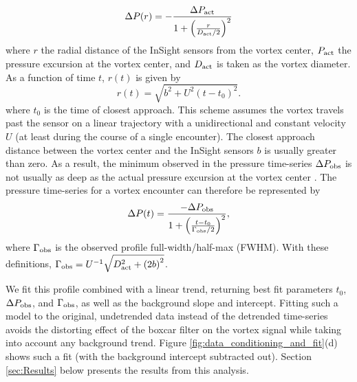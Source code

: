 \documentclass{aastex63}
\begin{document}
\begin{equation}
    \Delta P(r) = -\frac{\Delta P_{\rm act}}{1 + \left( \frac{r}{D_{\rm act}/2} \right)^2}\label{eqn:radial_lorentzian_profile}
\end{equation}
where $r$ the radial distance of the InSight sensors from the vortex center, $P_{\rm act}$ the pressure excursion at the vortex center, and $D_{\rm act}$ is taken as the vortex diameter. As a function of time $t$, $r(t)$ is given by
\begin{equation}
    r(t) = \sqrt{b^2 + U^2 \left( t - t_0 \right)^2}.\label{eqn:radial_distance}
\end{equation}
where $t_0$ is the time of closest approach. This scheme assumes the vortex travels past the sensor on a linear trajectory with a unidirectional and constant velocity $U$ (at least during the course of a single encounter). The closest approach distance between the vortex center and the InSight sensors $b$ is usually greater than zero. As a result, the minimum observed in the pressure time-series $\Delta P_{\rm obs}$ is not usually as deep as the actual pressure excursion at the vortex center \citep{2018Icar..299..166J, 2019Icar..317..209K}. The pressure time-series for a vortex encounter can therefore be represented by 
\begin{equation}
    \Delta P(t) = \frac{-\Delta P_{\rm obs}}{1 + \left( \frac{ t - t_0 }{\Gamma_{\rm obs}/2} \right)^2},\label{eqn:Lorentzian_profile}
\end{equation}
where $\Gamma_{\rm obs}$ is the observed profile full-width/half-max (FWHM). With these definitions, $\Gamma_{\rm obs} = U^{-1} \sqrt{D_{\rm act}^2 + \left( 2 b \right)^2}$. 

We fit this profile combined with a linear trend, returning best fit parameters $t_0$, $\Delta P_{\rm obs}$, and $\Gamma_{\rm obs}$, as well as the background slope and intercept. Fitting such a model to the original, undetrended data instead of the detrended time-series avoids the distorting effect of the boxcar filter on the vortex signal while taking into account any background trend. Figure \ref{fig:data_conditioning_and_fit}(d) shows such a fit (with the background intercept subtracted out). Section \ref{sec:Results} below presents the results from this analysis.
\end{document}
